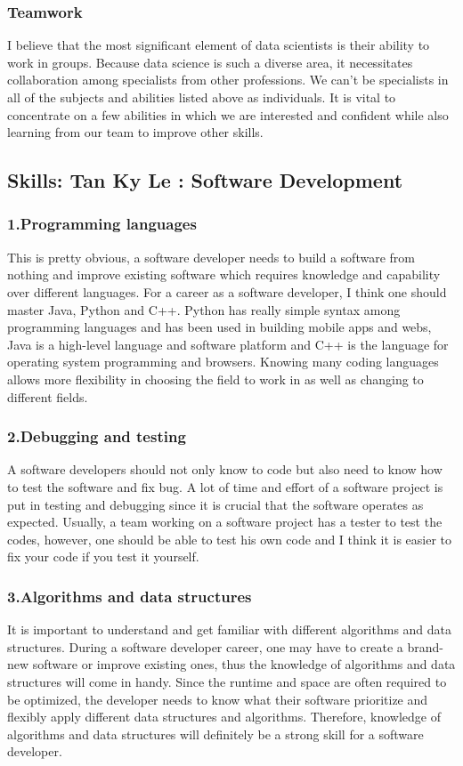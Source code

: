 \documentclass[a4paper, 11pt]{report}
\begin{document}
    \subsubsection{Teamwork}
    I believe that the most significant element of data scientists is their ability to work in groups. Because data science is such a diverse area, it necessitates collaboration among specialists from other professions. We can't be specialists in all of the subjects and abilities listed above as individuals. It is vital to concentrate on a few abilities in which we are interested and confident while also learning from our team to improve other skills.

\subsection{Skills: Tan Ky Le : Software Development}
	\subsubsection{1.Programming languages}
	This is pretty obvious, a software developer needs to build a software from nothing and improve existing software which requires knowledge and capability over different languages. For a career as a software developer, I think one should master Java, Python and C++. Python has really simple syntax among programming languages and has been used in building mobile apps and webs, Java is a high-level language and software platform and C++ is the language for operating system programming and browsers\cite{ky1}. Knowing many coding languages allows more flexibility in choosing the field to work in as well as changing to different fields.
	\subsubsection{2.Debugging and testing}
	A software developers should not only know to code but also need to know how to test the software and fix bug. A lot of time and effort of a software project is put in testing and debugging since it is crucial that the software operates as expected. Usually, a team working on a software project has a tester to test the codes, however, one should be able to test his own code and I think it is easier to fix your code if you test it yourself. \cite{ky2}
	\subsubsection{3.Algorithms and data structures}
	It is important to understand and get familiar with different algorithms and data structures. During a software developer career, one may have to create a brand-new software or improve existing ones, thus the knowledge of algorithms and data structures will come in handy. Since the runtime and space are often required to be optimized, the developer needs to know what their software prioritize and flexibly apply different data structures and algorithms. Therefore, knowledge of algorithms and data structures will definitely be a strong skill for a software developer.
\end{document}
